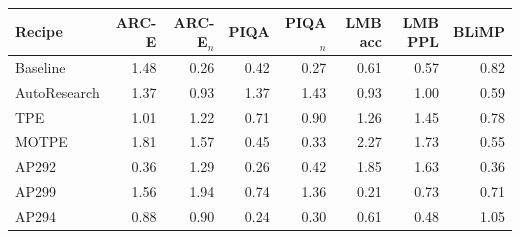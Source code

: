 \begin{tabular}{lrrrrrrr}
\toprule
Recipe & ARC-E & ARC-E$_n$ & PIQA & PIQA$_n$ & LMB acc & LMB PPL & BLiMP \\
\midrule
Baseline & 1.48 & 0.26 & 0.42 & 0.27 & 0.61 & 0.57 & 0.82 \\
AutoResearch & 1.37 & 0.93 & 1.37 & 1.43 & 0.93 & 1.00 & 0.59 \\
TPE & 1.01 & 1.22 & 0.71 & 0.90 & 1.26 & 1.45 & 0.78 \\
MOTPE & 1.81 & 1.57 & 0.45 & 0.33 & 2.27 & 1.73 & 0.55 \\
AP292 & 0.36 & 1.29 & 0.26 & 0.42 & 1.85 & 1.63 & 0.36 \\
AP299 & 1.56 & 1.94 & 0.74 & 1.36 & 0.21 & 0.73 & 0.71 \\
AP294 & 0.88 & 0.90 & 0.24 & 0.30 & 0.61 & 0.48 & 1.05 \\
\bottomrule
\end{tabular}
